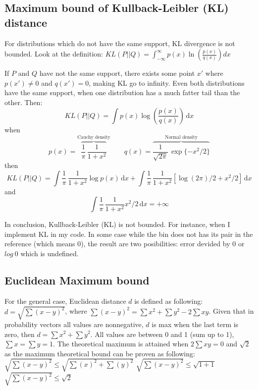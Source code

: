 \documentclass{article}
\begin{document}



\subsection{Maximum bound of Kullback-Leibler (KL) distance}

For distributions which do not have the same support, KL divergence is not bounded. Look at the definition: $KL(P\vert\vert Q) = \int_{-\infty}^{\infty} p(x)\ln\left(\frac{p(x)}{q(x)}\right) dx$

If $ P $ and $ Q $ have not the same support, there exists some point $x'$ where $p(x') \neq 0$ and $q(x') = 0$, making KL go to infinity. Even both distributions have the same support, when one distribution has a much fatter tail than the other. Then:
$$KL(P\vert\vert Q) = \int p(x)\log\left(\frac{p(x)}{q(x)}\right) \,\text{d}x$$
when
$$p(x)=\overbrace{\frac{1}{\pi}\,\frac{1}{1+x^2}}^\text{Cauchy density}\qquad q(x)=\overbrace{\frac{1}{\sqrt{2\pi}}\,\exp\{-x^2/2\}}^\text{Normal density}$$
then
$$KL(P\vert\vert Q) = \int \frac{1}{\pi}\,\frac{1}{1+x^2} \log p(x) \,\text{d}x + \int \frac{1}{\pi}\,\frac{1}{1+x^2} [\log(2\pi)/2+x^2/2]\,\text{d}x$$
and
$$\int \frac{1}{\pi}\,\frac{1}{1+x^2} x^2/2\,\text{d}x=+\infty$$

In conclusion, Kullback-Leibler (KL) is not bounded. For instance, when I implement KL in my code. In some case while the bin does not has its pair in the reference (which means 0), the result are two posibilities: error devided by 0 or $ log\ 0 $ which is undefined. 


\subsection{Euclidean Maximum bound}
For the general case, Euclidean distance $d$ is defined as following: 
$d = \sqrt{\sum{(x-y)^2}}$, where $ \sum{(x-y)^2} = \sum x^2 + \sum y^2 - 2\sum xy$. Given that in probability vectors all values are nonnegative, $d$ is max when the last term is zero, then $d = \sum x^2 + \sum y^2$. All values are between 0 and 1 (sum up to 1), $\sum x = \sum y = 1$. The theoretical maximum is attained when $2\sum xy = 0$ and $\sqrt{2}$ as the maximum theoretical bound can be proven as following: 
\newline
$ \sqrt{\sum{(x-y)^2}} \leq \sqrt{\sum{(x)^2} + \sum{(y)^2}} $
\newline
$ \sqrt{\sum{(x-y)^2}} \leq \sqrt{1 + 1} $
\newline
$ \sqrt{\sum{(x-y)^2}} \leq \sqrt{2} $
\end{document}
